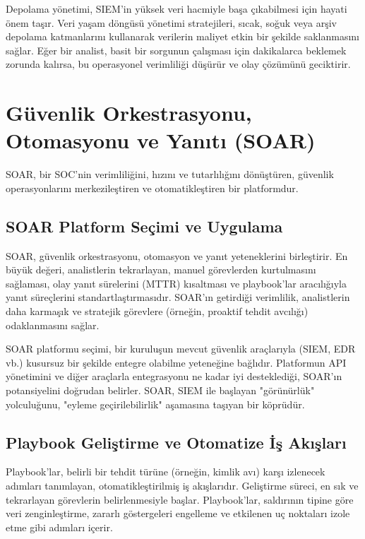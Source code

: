 Depolama yönetimi, SIEM'in yüksek veri hacmiyle başa çıkabilmesi için hayati önem taşır. Veri yaşam döngüsü yönetimi stratejileri, sıcak, soğuk veya arşiv depolama katmanlarını kullanarak verilerin maliyet etkin bir şekilde saklanmasını sağlar. Eğer bir analist, basit bir sorgunun çalışması için dakikalarca beklemek zorunda kalırsa, bu operasyonel verimliliği düşürür ve olay çözümünü geciktirir.

\section{Güvenlik Orkestrasyonu, Otomasyonu ve Yanıtı (SOAR)}

SOAR, bir SOC'nin verimliliğini, hızını ve tutarlılığını dönüştüren, güvenlik operasyonlarını merkezileştiren ve otomatikleştiren bir platformdur.

\subsection{SOAR Platform Seçimi ve Uygulama}

SOAR, güvenlik orkestrasyonu, otomasyon ve yanıt yeteneklerini birleştirir. En büyük değeri, analistlerin tekrarlayan, manuel görevlerden kurtulmasını sağlaması, olay yanıt sürelerini (MTTR) kısaltması ve playbook'lar aracılığıyla yanıt süreçlerini standartlaştırmasıdır. SOAR'ın getirdiği verimlilik, analistlerin daha karmaşık ve stratejik görevlere (örneğin, proaktif tehdit avcılığı) odaklanmasını sağlar.

SOAR platformu seçimi, bir kuruluşun mevcut güvenlik araçlarıyla (SIEM, EDR vb.) kusursuz bir şekilde entegre olabilme yeteneğine bağlıdır. Platformun API yönetimini ve diğer araçlarla entegrasyonu ne kadar iyi desteklediği, SOAR'ın potansiyelini doğrudan belirler. SOAR, SIEM ile başlayan "görünürlük" yolculuğunu, "eyleme geçirilebilirlik" aşamasına taşıyan bir köprüdür.

\subsection{Playbook Geliştirme ve Otomatize İş Akışları}

Playbook'lar, belirli bir tehdit türüne (örneğin, kimlik avı) karşı izlenecek adımları tanımlayan, otomatikleştirilmiş iş akışlarıdır. Geliştirme süreci, en sık ve tekrarlayan görevlerin belirlenmesiyle başlar. Playbook'lar, saldırının tipine göre veri zenginleştirme, zararlı göstergeleri engelleme ve etkilenen uç noktaları izole etme gibi adımları içerir.


